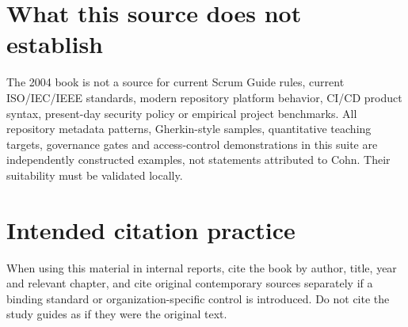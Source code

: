 \documentclass[11pt,letterpaper]{article}
\begin{document}
\section{What this source does not establish}
The 2004 book is not a source for current Scrum Guide rules, current ISO/IEC/IEEE standards, modern repository platform behavior, CI/CD product syntax, present-day security policy or empirical project benchmarks. All repository metadata patterns, Gherkin-style samples, quantitative teaching targets, governance gates and access-control demonstrations in this suite are independently constructed examples, not statements attributed to Cohn. Their suitability must be validated locally.

\section{Intended citation practice}
When using this material in internal reports, cite the book by author, title, year and relevant chapter, and cite original contemporary sources separately if a binding standard or organization-specific control is introduced. Do not cite the study guides as if they were the original text.
\end{document}
